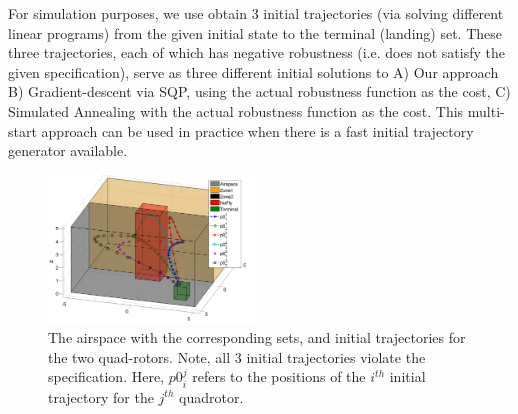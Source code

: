 For simulation purposes, we use obtain 3 initial trajectories (via solving different linear programs) from the given initial state to the terminal (landing) set. These three trajectories, each of which has negative robustness (i.e. does not satisfy the given specification), serve as three different initial solutions to A) Our approach B) Gradient-descent via SQP, using the actual robustness function as the cost, C) Simulated Annealing with the actual robustness function as the cost. This multi-start approach can be used in practice when there is a fast initial trajectory generator available.

\begin{figure}[t]
\centering
\includegraphics[width=0.49\textwidth]{figures/QuadInitTrajs_scissored}
\caption{The airspace with the corresponding sets, and initial trajectories for the two quad-rotors. Note, all 3 initial trajectories violate the specification. Here, $p0_{i}^j$ refers to the positions of the $i^{th}$ initial trajectory for the $j^{th}$ quadrotor.}
\label{fig:quad_init}
\end{figure}


